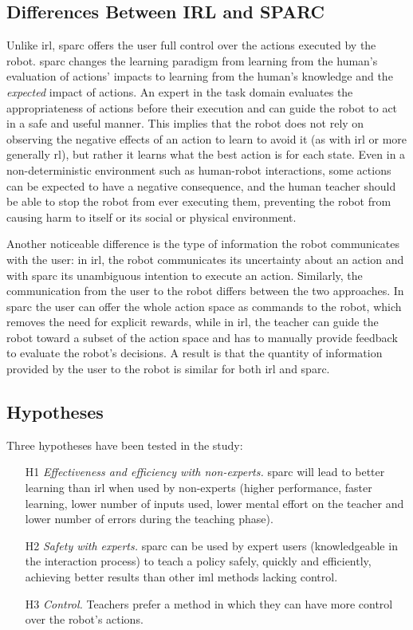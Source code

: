 \subsection{Differences Between IRL and SPARC}

Unlike \gls{irl}, \gls{sparc} offers the user full control over the actions executed by the robot. \gls{sparc} changes the learning paradigm from learning from the human's evaluation of actions' impacts to learning from the human's knowledge and the \emph{expected} impact of actions. An expert in the task domain evaluates the appropriateness of actions before their execution and can guide the robot to act in a safe and useful manner. This implies that the robot does not rely on observing the negative effects of an action to learn to avoid it (as with \gls{irl} or more generally \gls{rl}), but rather it learns what the best action is for each state. Even in a non-deterministic environment such as human-robot interactions, some actions can be expected to have a negative consequence, and the human teacher should be able to stop the robot from ever executing them, preventing the robot from causing harm to itself or its social or physical environment. 

Another noticeable difference is the type of information the robot communicates with the user: in \gls{irl}, the robot communicates its uncertainty about an action and with \gls{sparc} its unambiguous intention to execute an action. Similarly, the communication from the user to the  robot differs between the two approaches. In \gls{sparc} the user can offer the whole action space as commands to the robot, which removes the need for explicit rewards, while in \gls{irl}, the teacher can guide the robot toward a subset of the action space and has to manually provide feedback to evaluate the robot's decisions. A result is that the quantity of information provided by the user to the robot is similar for both \gls{irl} and \gls{sparc}. 

\subsection{Hypotheses}

Three hypotheses have been tested in the study:

\begin{enumerate}
	\item [H1] \textit{Effectiveness and efficiency with non-experts.} \gls{sparc} will lead to better learning than \gls{irl} when used by non-experts (higher performance, faster learning, lower number of inputs used, lower mental effort on the teacher and lower number of errors during the teaching phase). 
	\item [H2] \textit{Safety with experts.} \gls{sparc} can be used by expert users (knowledgeable in the interaction process) to teach a policy safely, quickly and efficiently, achieving better results than other \gls{iml} methods lacking control.
	\item [H3] \textit{Control.} Teachers prefer a method in which they can have more control over the robot's actions.
\end{enumerate}
